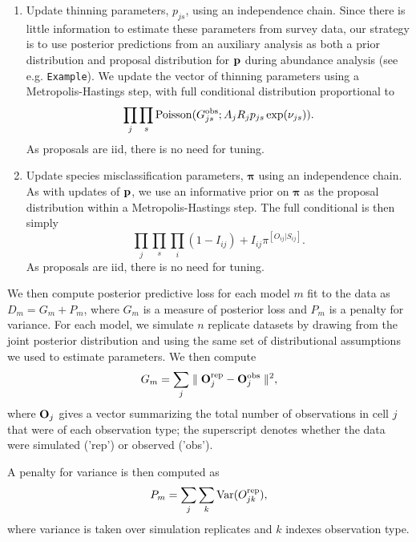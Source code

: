 \documentclass[12pt,fleqn]{article}
\begin{document}
\begin{flushleft}
\begin{enumerate}
  \item Update thinning parameters, $p_{js}$, using an independence chain.  Since there is little information to estimate these parameters from survey data, our strategy is to use posterior predictions from an auxiliary analysis as both a prior distribution and proposal distribution for ${\bf p}$ during abundance analysis (see e.g. \texttt{Example}).  We update the vector of thinning parameters using a Metropolis-Hastings step, with full conditional distribution proportional to \begin{equation*}
      \prod_j \prod_s {\rm Poisson}(G_{js}^{\rm obs};A_j R_j p_{js} \exp(\nu_{js})).
      \end{equation*} 
      As proposals are iid, there is no need for tuning.\\

  \item Update species misclassification parameters, $\boldsymbol{\pi}$ using an independence chain.  As with
      updates of ${\bf p}$, we use an informative prior on $\boldsymbol{\pi}$ as the proposal distribution within a Metropolis-Hastings step.  The full conditional is then simply
      \begin{equation*}
        \prod_j \prod_s \prod_i (1-I_{ij})+I_{ij} \pi^{[O_{ij}|S_{ij}]}.
      \end{equation*}
          As proposals are iid, there is no need for tuning.
\end{enumerate}

We then compute posterior predictive loss for each model $m$ fit to the data as $D_m = G_m + P_m$,
where $G_m$ is a measure of posterior loss and $P_m$ is a penalty for variance.
For each model, we simulate $n$ replicate datasets by drawing from the joint posterior distribution and
using the same set of distributional assumptions we used to estimate parameters.  We then compute
\begin{equation*}
   G_m = \sum_j \parallel {\bf O}_{j}^{\rm rep} - {\bf O}_j^{\rm obs} \parallel ^2,
\end{equation*}
where ${\bf O}_{j}$ gives a vector summarizing the total number of observations in cell $j$ that were
 of each observation type; the superscript denotes whether the data were simulated ('rep') or observed
 ('obs').

A penalty for variance is then computed as
\begin{equation*}
   P_m = \sum_j \sum_k {\rm Var}(O_{jk}^{\rm rep}),
\end{equation*}
where variance is taken over simulation replicates and $k$ indexes observation type.

\renewcommand{\refname}{Literature Cited}




\end{flushleft}
\end{document}

